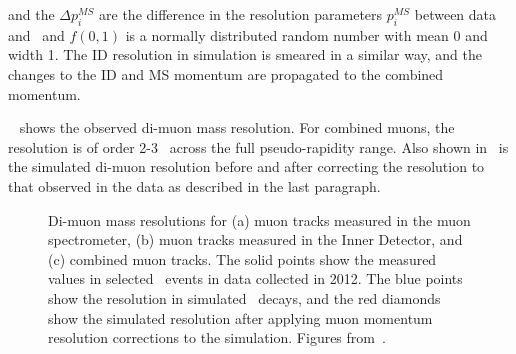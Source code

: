 and the $ \Delta p_{i}^{MS} $ are the difference in the resolution parameters $
p_{i}^{MS} $ between data and \mcsim\ and $f(0,1)$ is a normally distributed
random number with mean 0 and width 1. The ID resolution in simulation is
smeared in a similar way, and the changes to the ID and MS momentum are propagated
to the combined momentum.



~ shows the observed di-muon mass resolution. For
combined muons, the resolution is of order 2-3 \gev\ across the full
pseudo-rapidity range. Also shown in~ is the simulated
di-muon resolution before and after correcting the resolution to that observed
in the data as described in the last paragraph.

\begin{figure}[h]
\centering
    \caption[Di-muon mass resolutions for muon tracks measured in the muon
    spectrometer, muon tracks measured in the Inner Detector, and combined muon
    tracks.]{Di-muon mass resolutions for (a) muon tracks measured in the muon
    spectrometer, (b) muon tracks measured in the Inner Detector, and (c) combined
    muon tracks. The solid points show the measured values in selected \Zmm\ events
    in data collected in 2012. The blue points show the resolution in simulated
    \Zmm\ decays, and the red diamonds show the simulated resolution after applying
    muon momentum resolution corrections to the simulation. Figures
    from~\cite{MuonPerfPlots2012}.}
\label{fig:mu-resolution-dimu}
\end{figure}

